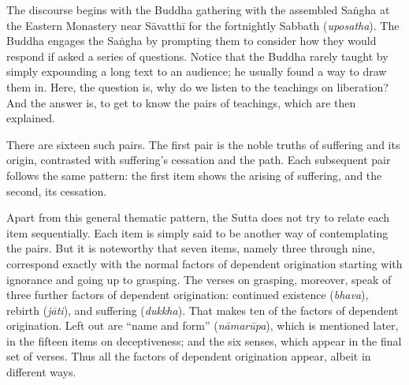 \documentclass[12pt,openany]{book}%
\begin{document}
The discourse begins with the Buddha gathering with the assembled \textsanskrit{Saṅgha} at the Eastern Monastery near \textsanskrit{Sāvatthī} for the fortnightly Sabbath (\textit{uposatha}). The Buddha engages the \textsanskrit{Saṅgha} by prompting them to consider how they would respond if asked a series of questions. Notice that the Buddha rarely taught by simply expounding a long text to an audience; he usually found a way to draw them in. Here, the question is, why do we listen to the teachings on liberation? And the answer is, to get to know the pairs of teachings, which are then explained.

There are sixteen such pairs. The first pair is the noble truths of suffering and its origin, contrasted with suffering’s cessation and the path. Each subsequent pair follows the same pattern: the first item shows the arising of suffering, and the second, its cessation.

Apart from this general thematic pattern, the Sutta does not try to relate each item sequentially. Each item is simply said to be another way of contemplating the pairs. But it is noteworthy that seven items, namely three through nine, correspond exactly with the normal factors of dependent origination starting with ignorance and going up to grasping. The verses on grasping, moreover, speak of three further factors of dependent origination: continued existence (\textit{bhava}), rebirth (\textit{\textsanskrit{jāti}}), and suffering (\textit{dukkha}). That makes ten of the factors of dependent origination. Left out are “name and form” (\textit{\textsanskrit{nāmarūpa}}), which is mentioned later, in the fifteen items on deceptiveness; and the six senses, which appear in the final set of verses. Thus all the factors of dependent origination appear, albeit in different ways.
\end{document}
